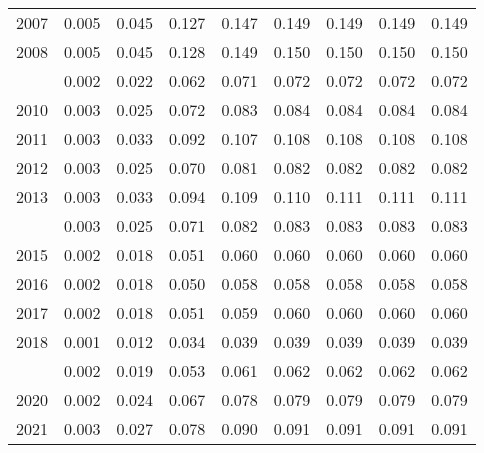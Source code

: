 \documentclass[
]{article}
\begin{document}
\begin{longtable}[t]{lrrrrrrrr}
2007 & 0.005 & 0.045 & 0.127 & 0.147 & 0.149 & 0.149 & 0.149 & 0.149\\
2008 & 0.005 & 0.045 & 0.128 & 0.149 & 0.150 & 0.150 & 0.150 & 0.150\\
\addlinespace
2009 & 0.002 & 0.022 & 0.062 & 0.071 & 0.072 & 0.072 & 0.072 & 0.072\\
2010 & 0.003 & 0.025 & 0.072 & 0.083 & 0.084 & 0.084 & 0.084 & 0.084\\
2011 & 0.003 & 0.033 & 0.092 & 0.107 & 0.108 & 0.108 & 0.108 & 0.108\\
2012 & 0.003 & 0.025 & 0.070 & 0.081 & 0.082 & 0.082 & 0.082 & 0.082\\
2013 & 0.003 & 0.033 & 0.094 & 0.109 & 0.110 & 0.111 & 0.111 & 0.111\\
\addlinespace
2014 & 0.003 & 0.025 & 0.071 & 0.082 & 0.083 & 0.083 & 0.083 & 0.083\\
2015 & 0.002 & 0.018 & 0.051 & 0.060 & 0.060 & 0.060 & 0.060 & 0.060\\
2016 & 0.002 & 0.018 & 0.050 & 0.058 & 0.058 & 0.058 & 0.058 & 0.058\\
2017 & 0.002 & 0.018 & 0.051 & 0.059 & 0.060 & 0.060 & 0.060 & 0.060\\
2018 & 0.001 & 0.012 & 0.034 & 0.039 & 0.039 & 0.039 & 0.039 & 0.039\\
\addlinespace
2019 & 0.002 & 0.019 & 0.053 & 0.061 & 0.062 & 0.062 & 0.062 & 0.062\\
2020 & 0.002 & 0.024 & 0.067 & 0.078 & 0.079 & 0.079 & 0.079 & 0.079\\
2021 & 0.003 & 0.027 & 0.078 & 0.090 & 0.091 & 0.091 & 0.091 & 0.091\\*
\end{longtable}
\end{document}
